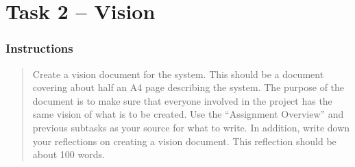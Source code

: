 %
%
%
%


\section{Task 2 -- Vision}\label{task-2-vision}

\subsubsection{Instructions}\label{task-2-instructions}
\begin{quote}
  Create a vision document for the system. This should be a document covering
  about half an A4 page describing the system. The purpose of the document is
  to make sure that everyone involved in the project has the same vision of
  what is to be created. Use the ``Assignment Overview'' and previous subtasks
  as your source for what to write. In addition, write down your reflections on
  creating a vision document. This reflection should be about 100 words.
\end{quote}


